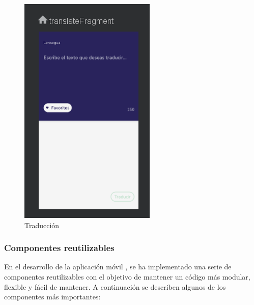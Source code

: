 \begin{figure} [H]
    \centering
    \includegraphics[width=0.3\linewidth]{figuras/tarduccion.png}
    \caption{Traducción}
    \label{fig:enter-label}
\end{figure}



\subsubsection{Componentes reutilizables}

En el desarrollo de la aplicación móvil , se ha implementado una serie de componentes reutilizables con el objetivo de mantener un código más modular, flexible y fácil de mantener. A continuación se describen algunos de los componentes más importantes:

